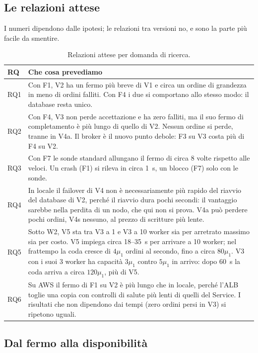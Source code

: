 \subsection{Le relazioni attese}

I numeri dipendono dalle ipotesi; le relazioni tra versioni no, e sono la parte più facile da smentire.

\begin{table}[H]
\centering
\caption{Relazioni attese per domanda di ricerca.}
\label{tab:relazioni}
\begin{tabularx}{\linewidth}{@{}lL@{}}
\toprule
\textbf{RQ} & \textbf{Che cosa prevediamo} \\
\midrule
RQ1 & Con F1, V2 ha un fermo più breve di V1 e circa un ordine di grandezza in meno di ordini falliti. Con F4 i due si comportano allo stesso modo: il database resta unico. \\
RQ2 & Con F4, V3 non perde accettazione e ha zero falliti, ma il suo fermo di completamento è più lungo di quello di V2. Nessun ordine si perde, tranne in V4a. Il broker è il nuovo punto debole: F3 su V3 costa più di F4 su V2. \\
RQ3 & Con F7 le sonde standard allungano il fermo di circa 8 volte rispetto alle veloci. Un crash (F1) si rileva in circa 1~s, un blocco (F7) solo con le sonde. \\
RQ4 & In locale il failover di V4 non è necessariamente più rapido del riavvio del database di V2, perché il riavvio dura pochi secondi: il vantaggio sarebbe nella perdita di un nodo, che qui non si prova. V4a può perdere pochi ordini, V4s nessuno, al prezzo di scritture più lente. \\
RQ5 & Sotto W2, V5 sta tra V3 a 1 e V3 a 10 worker sia per arretrato massimo sia per costo. V5 impiega circa 18--35~s per arrivare a 10 worker; nel frattempo la coda cresce di $4\mu_1$ ordini al secondo, fino a circa $80\mu_1$. V3 con i suoi 3 worker ha capacità $3\mu_1$ contro $5\mu_1$ in arrivo: dopo 60~s la coda arriva a circa $120\mu_1$, più di V5. \\
RQ6 & Su AWS il fermo di F1 su V2 è più lungo che in locale, perché l'ALB toglie una copia con controlli di salute più lenti di quelli del Service. I risultati che non dipendono dai tempi (zero ordini persi in V3) si ripetono uguali. \\
\bottomrule
\end{tabularx}
\end{table}

\subsection{Dal fermo alla disponibilità}

